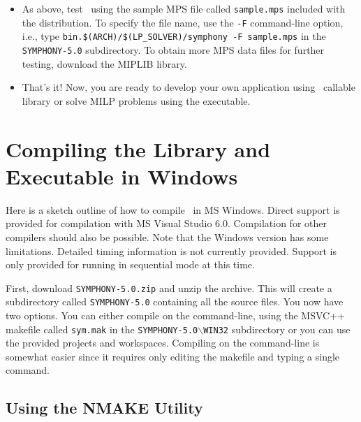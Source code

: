 \begin{itemize}
        \item As above, test \BB\ using the sample MPS file called
        \texttt{sample.mps} included with the distribution. To specify the
        file name, use the \texttt{-F} command-line option, i.e., type
        \texttt{bin.\$(ARCH)/\$(LP\_SOLVER)/symphony -F sample.mps} in the
        \texttt{SYMPHONY-5.0} subdirectory. To obtain more MPS data files
        for further testing, download the MIPLIB library.

        \item That's it! Now, you are ready to develop your own application 
	using \BB\ callable library or solve MILP problems using the 
	executable.

\end{itemize}


\section{Compiling the Library and Executable in Windows}
\label{getting_started_windows}

Here is a sketch outline of how to compile \BB\ in MS Windows. Direct
support is provided for compilation with MS Visual Studio 6.0. Compilation for
other compilers should also be possible. Note that the Windows version has
some limitations. Detailed timing information is not currently provided.
Support is only provided for running in sequential mode at this time.

First, download \texttt{SYMPHONY-5.0.zip} and unzip the archive. This will
create a subdirectory called \texttt{SYMPHONY-5.0} containing all
the source files. You now have two options. You can either compile on the
command-line, using the MSVC++ makefile called
\texttt{sym.mak} in the \texttt{SYMPHONY-5.0$\backslash$WIN32} subdirectory or 
you can use the provided projects and workspaces. Compiling on the command-line 
is somewhat easier since it requires only editing the makefile and typing a
single command.

\subsection{Using the NMAKE Utility}
\label{using_nmake}

